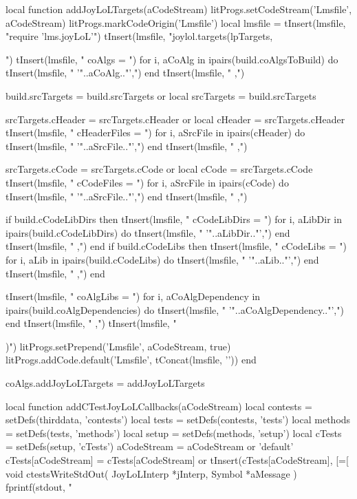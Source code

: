 \startLuaCode
local function addJoyLoLTargets(aCodeStream)
  litProgs.setCodeStream('Lmsfile', aCodeStream)
  litProgs.markCodeOrigin('Lmsfile')
  local lmsfile = {}
  tInsert(lmsfile, "require 'lms.joyLoL'\n")
  tInsert(lmsfile, "joylol.targets(lpTargets, {")
  tInsert(lmsfile, "  coAlgs = {")
  for i, aCoAlg in ipairs(build.coAlgsToBuild) do
    tInsert(lmsfile, "    '"..aCoAlg.."',")
  end
  tInsert(lmsfile, "  },")
  
  build.srcTargets = build.srcTargets or { }
  local srcTargets = build.srcTargets
  
  srcTargets.cHeader = srcTargets.cHeader or { }
  local cHeader      = srcTargets.cHeader
  tInsert(lmsfile, "  cHeaderFiles = {")
  for i, aSrcFile in ipairs(cHeader) do
    tInsert(lmsfile, "    '"..aSrcFile.."',")
  end
  tInsert(lmsfile, "  },")
  
  srcTargets.cCode = srcTargets.cCode or { }
  local cCode      = srcTargets.cCode
  tInsert(lmsfile, "  cCodeFiles = {")
  for i, aSrcFile in ipairs(cCode) do
    tInsert(lmsfile, "    '"..aSrcFile.."',")
  end
  tInsert(lmsfile, "  },")

  if build.cCodeLibDirs then 
    tInsert(lmsfile, "  cCodeLibDirs = {")
    for i, aLibDir in ipairs(build.cCodeLibDirs) do
      tInsert(lmsfile, "    '"..aLibDir.."',")
    end
    tInsert(lmsfile, "  },")
  end
  if build.cCodeLibs then 
    tInsert(lmsfile, "  cCodeLibs = {")
    for i, aLib in ipairs(build.cCodeLibs) do
      tInsert(lmsfile, "    '"..aLib.."',")
    end
    tInsert(lmsfile, "  },")
  end

  tInsert(lmsfile, "  coAlgLibs = {")
  for i, aCoAlgDependency in ipairs(build.coAlgDependencies) do
    tInsert(lmsfile, "    '"..aCoAlgDependency.."',")
  end
  tInsert(lmsfile, "  },")
  tInsert(lmsfile, "})")
  litProgs.setPrepend('Lmsfile', aCodeStream, true)
  litProgs.addCode.default('Lmsfile', tConcat(lmsfile, '\n'))
end

coAlgs.addJoyLoLTargets = addJoyLoLTargets
\stopLuaCode

\startMkIVCode
\def\addCTestJoyLoLCallbacks#1{%
  \directlua{
    thirddata.joylolCoAlgs.addCTestJoyLoLCallbacks('#1')
  }
}
\stopMkIVCode

\startLuaCode
local function addCTestJoyLoLCallbacks(aCodeStream)
  local contests      = setDefs(thirddata, 'contests')
  local tests         = setDefs(contests, 'tests')
  local methods       = setDefs(tests, 'methods')
  local setup         = setDefs(methods, 'setup')
  local cTests        = setDefs(setup, 'cTests')
  aCodeStream         = aCodeStream         or 'default'
  cTests[aCodeStream] = cTests[aCodeStream] or { }
  tInsert(cTests[aCodeStream], [=[
void ctestsWriteStdOut(
  JoyLoLInterp *jInterp,
  Symbol       *aMessage
) {
  fprintf(stdout, "%
}

